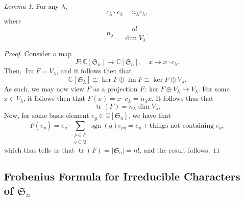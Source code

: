 \documentclass[a4paper]{report}
\theoremstyle{definition}
\theoremstyle{remark}
\theoremstyle{proposition}
\theoremstyle{conjecture}
\theoremstyle{lemma}
\newtheorem{lemma}{Lemma}
\theoremstyle{corollary}
\theoremstyle{exercise}
\theoremstyle{example}
\newcommand{\C}{\mathbb{C}}
\newcommand{\on}{\operatorname}
\begin{document}
\begin{lemma}
    For any $\lambda$, $$c_\lambda\cdot c_\lambda = n_\lambda c_\lambda,$$
    where $$n_\lambda = \frac{n!}{\dim V_\lambda}.$$
\end{lemma}

\begin{proof}
    Consider a map $$F : \C[\mathfrak{S}_n]\longrightarrow \C[\mathfrak{S}_n],\quad x \longmapsto x\cdot c_\lambda.$$
    Then, $\on{Im}F = V_\lambda$, and it follows then that 
    $$\C[\mathfrak{S}_\lambda] \cong \ker F \oplus \on{Im}F \cong \ker F \oplus V_\lambda.$$ 
    As such, we may now view $F$ as a projection
    $F: \ker F \oplus V_\lambda \to V_\lambda$. 
    For some $x \in V_\lambda$, it follows then that $F(x) = x\cdot c_\lambda=n_\lambda x$. 
    It follows thus that 
    $$\on{tr}(F) = n_\lambda \dim V_\lambda.$$
    Now, for some basis element $e_g\in\C[\mathfrak{S}_n]$, 
    we have that $$F(e_g) = e_g \cdot \sum_{\substack{p\in P\\q \in Q}}\on{sgn}(q)e_{pq} = e_g + \text{things not containing $e_g$},$$
    which thus tells us that $\on{tr}(F) = \vert \mathfrak{S}_n\vert = n!$,
    and the result follows.

\end{proof}

\subsection{Frobenius Formula for Irreducible Characters of $\mathfrak{S}_n$}
\end{document}
